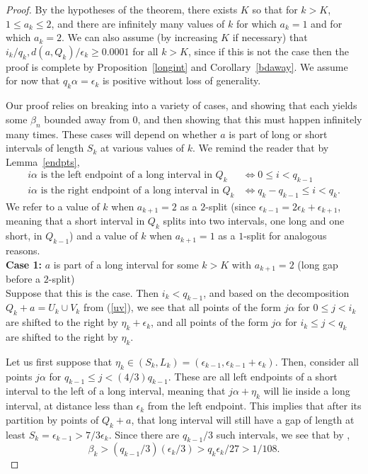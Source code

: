 \documentclass[10pt,a4paper]{amsart}
\begin{document}
\begin{proof}
By the hypotheses of the theorem, there exists $K$ so that for $k > K$, $1 \leq a_k \leq 2$, and there are infinitely many values of $k$ for which $a_k = 1$ and for which $a_k = 2$. We can also assume (by increasing $K$ if necessary) that
$i_k/q_k, d(a, Q_k)/\epsilon_k \geq 0.0001$ for all $k > K$, since if this is not the case then the proof is complete by 
Proposition~\ref{longint} and Corollary~\ref{bdaway}. We assume for now that $q_k \alpha = \epsilon_k$ is positive without loss of generality.

Our proof relies on breaking into a variety of cases, and showing that each yields some $\beta_n$ bounded away from $0$, and then showing that this must happen infinitely many times. These cases will depend on whether $a$ is part of long or short intervals of length $S_k$ at various values of $k$. We remind the reader that by Lemma~\ref{endpts},
\begin{align*}
i \alpha \textrm{ is the left endpoint of a long interval in } Q_k & \Longleftrightarrow 0 \leq i < q_{k-1}\\
i \alpha \textrm{ is the right endpoint of a long interval in } Q_k & \Longleftrightarrow q_k - q_{k-1} \leq i < q_{k}.
\end{align*}
We refer to a value of $k$ when $a_{k+1} = 2$ as a $2$-split (since $\epsilon_{k-1} = 2\epsilon_{k} + \epsilon_{k+1}$, meaning that a short interval in $Q_k$ splits into two intervals, one long and one short, in $Q_{k-1}$) and a value of $k$ when $a_{k+1} = 1$ as a $1$-split for analogous reasons.\\

\noindent
\textbf{Case 1:} $a$ is part of a long interval for some $k > K$ with $a_{k+1} = 2$ (long gap before a $2$-split)\\

Suppose that this is the case. Then $i_k < q_{k-1}$, and based on the decomposition $Q_k + a = U_k \cup V_k$ from (\ref{uv}),
we see that all points of the form $j\alpha$ for $0 \leq j < i_k$ are shifted to the right by $\eta_k + \epsilon_k$, and all points of the form $j\alpha$ for $i_k \leq j < q_{k}$ are shifted to the right by $\eta_k$. %

Let us first suppose that $\eta_k \in (S_k, L_k) = (\epsilon_{k-1}, \epsilon_{k-1} + \epsilon_k)$. Then, consider all points $j\alpha$ for $q_{k-1} \leq j < (4/3)q_{k-1}$. These are all left endpoints of a short interval to the left of a long interval, meaning that $j\alpha + \eta_k$ will lie inside a long interval, at distance less than $\epsilon_k$ from the left endpoint. This implies that after its partition by points of $Q_k + a$, that long interval will still have a gap of length at least $S_k = \epsilon_{k-1} > 7/3 \epsilon_k$. Since there are $q_{k-1}/3$ such intervals, we see that by ,
\[
\beta_k > (q_{k-1}/3)(\epsilon_k/3) > q_k \epsilon_k/27 > 1/108.
\]


\end{proof}
\end{document}
